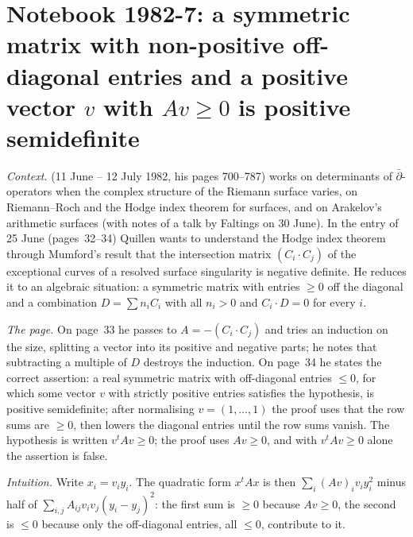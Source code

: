\section[Notebook 1982-7: symmetric matrices with non-positive off-diagonal entries]{Notebook 1982-7: a symmetric matrix with non-positive off-diagonal entries and a positive vector $v$ with $Av \ge 0$ is positive semidefinite\protect{}}\label{sec:quillen-1982-7}

\emph{Context.}  (11 June -- 12 July 1982, his pages 700--787) works on determinants of $\bar\partial$-operators when the complex structure of the Riemann surface varies, on Riemann--Roch and the Hodge index theorem for surfaces, and on Arakelov's arithmetic surfaces (with notes of a talk by Faltings on 30 June). In the entry of 25 June (pages~32--34) Quillen wants to understand the Hodge index theorem through Mumford's result that the intersection matrix $(C_i \cdot C_j)$ of the exceptional curves of a resolved surface singularity is negative definite. He reduces it to an algebraic situation: a symmetric matrix with entries $\ge 0$ off the diagonal and a combination $D = \sum n_i C_i$ with all $n_i > 0$ and $C_i \cdot D = 0$ for every $i$.

\emph{The page.} On page~33 he passes to $A = -(C_i \cdot C_j)$ and tries an induction on the size, splitting a vector into its positive and negative parts; he notes that subtracting a multiple of $D$ destroys the induction. On page~34 he states the correct assertion: a real symmetric matrix with off-diagonal entries $\le 0$, for which some vector $v$ with strictly positive entries satisfies the hypothesis, is positive semidefinite; after normalising $v = (1, \ldots, 1)$ the proof uses that the row sums are $\ge 0$, then lowers the diagonal entries until the row sums vanish. The hypothesis is written $v^{t}Av \ge 0$; the proof uses $Av \ge 0$, and with $v^{t}Av \ge 0$ alone the assertion is false.

\emph{Intuition.} Write $x_i = v_i y_i$. The quadratic form $x^{t}Ax$ is then $\sum_i (Av)_i v_i y_i^2$ minus half of $\sum_{i,j} A_{ij} v_i v_j (y_i - y_j)^2$: the first sum is $\ge 0$ because $Av \ge 0$, the second is $\le 0$ because only the off-diagonal entries, all $\le 0$, contribute to it.

